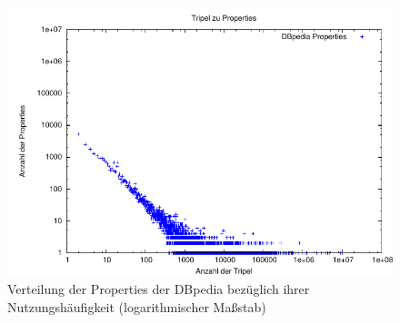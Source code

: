 \begin{figure}[tbh]
\includegraphics[width=\textwidth]{img/pdf/powerlaw_properties.pdf}
\caption[]{Verteilung der Properties der DBpedia bezüglich ihrer Nutzungshäufigkeit (logarithmischer Maßstab)}
\label{fig:powerlaw_properties_logarithmic_scale}
\end{figure}
